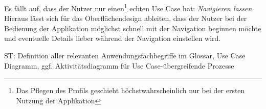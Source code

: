 \noindent Es fällt auf, dass der Nutzer nur einen\footnote{Das Pflegen des Profils geschieht höchstwahrscheinlich nur bei der ersten Nutzung der Applikation} echten Use Case hat: \emph{Navigieren lassen}. Hieraus lässt sich für das Oberflächendesign ableiten, dass der Nutzer bei der Bedienung der Applikation möglichst schnell mit der Navigation beginnen möchte und eventuelle Details lieber während der Navigation einstellen wird. 


ST: Definition aller relevanten Anwendungsfachbegriffe im Glossar, Use Case Diagramm, ggf. Aktivitätsdiagramm für Use Case-übergreifende Prozesse